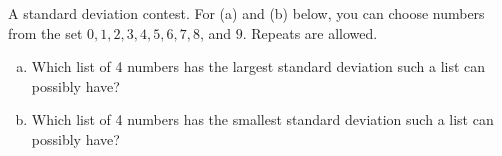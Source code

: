 

A standard deviation contest.  For (a) and (b) below, you can choose
numbers from the set $0,1,2,3,4,5,6,7,8$, and $9$.  Repeats are
allowed.
\begin{enumerate}[(a)]

\item Which list of 4 numbers has the largest standard
  deviation such a list can possibly have?

\begin{MultipleChoice}
\end{MultipleChoice}


\item Which list of 4 numbers has the smallest standard
  deviation such a list can possibly have?

\begin{MultipleChoice}
\end{MultipleChoice}


\end{enumerate}
